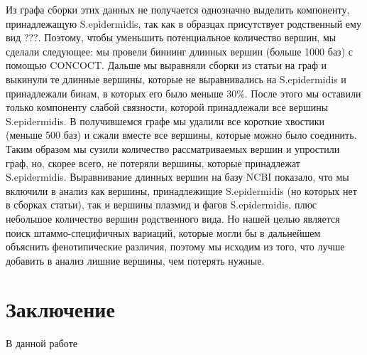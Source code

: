 \documentclass{spbau-diploma}
\begin{document}
Из графа сборки этих данных не получается однозначно выделить компоненту, принадлежащую S.epidermidis, так как в образцах присутствует родственный ему вид ???. Поэтому, чтобы уменьшить потенциальное количество вершин, мы сделали следующее: мы провели биннинг длинных вершин (больше 1000 баз) с помощью CONCOCT. Дальше мы выравняли сборки из статьи на граф и выкинули те длинные вершины, которые не выравнивались на S.epidermidis и принадлежали бинам, в которых его было меньше 30\%. После этого мы оставили только компоненту слабой связности, которой принадлежали все вершины S.epidermidis. В получившемся графе мы удалили все короткие хвостики (меньше 500 баз) и сжали вместе все вершины, которые можно было соединить. Таким образом мы сузили количество рассматриваемых вершин и упростили граф, но, скорее всего, не потеряли вершины, которые принадлежат S.epidermidis. Выравнивание длинных вершин на базу NCBI показало, что мы включили в анализ как вершины, принадлежищие S.epidermidis (но которых нет в сборках статьи), так и вершины плазмид и фагов S.epidermidis, плюс небольшое количество вершин родственного вида. Но нашей целью является поиск штаммо-специфичных вариаций, которые могли бы в дальнейшем объяснить фенотипические различия, поэтому мы исходим из того, что лучше добавить в анализ лишние вершины, чем потерять нужные.




\section*{Заключение}
В данной работе 








\end{document}
